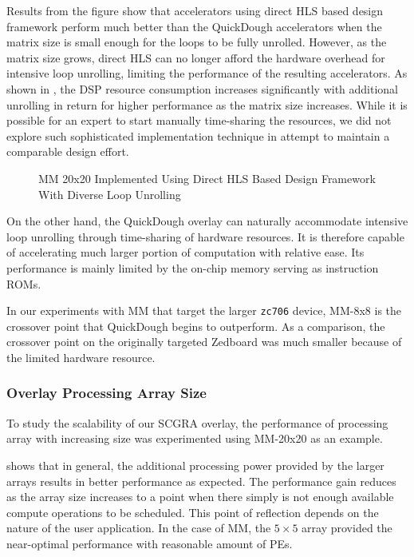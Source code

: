 Results from the figure show that accelerators using direct HLS based design framework perform much
better than the QuickDough accelerators when the matrix size is small enough for the loops to be
fully unrolled. However, as the matrix size grows, direct HLS can no longer afford the hardware overhead for
intensive loop unrolling, limiting the performance of the resulting accelerators. As shown in
, the DSP resource consumption increases significantly with
additional unrolling in return for higher performance as the matrix size increases.  While it is
possible for an expert to start manually time-sharing the resources, we did not explore such
sophisticated implementation technique in attempt to maintain a comparable design effort.

\begin{figure}
\caption{MM 20x20 Implemented Using Direct HLS Based Design Framework With Diverse Loop Unrolling}
\label{fig:loop-unroll-and-pipeline}
\end{figure}

On the other hand, the QuickDough overlay can naturally accommodate intensive loop unrolling through
time-sharing of hardware resources. It is therefore capable of accelerating much larger portion of
computation with relative ease. Its performance is mainly limited by the on-chip memory serving as
instruction ROMs.

In our experiments with MM that target the larger \texttt{zc706} device, MM-8x8 is the crossover point that QuickDough begins to outperform.  As a comparison, the crossover point on the originally targeted Zedboard was much smaller because of the limited hardware resource.




\subsubsection{Overlay Processing Array Size}
To study the scalability of our SCGRA overlay, the performance of processing array with increasing size was experimented using MM-20x20 as an example.

 shows that in general, the additional processing power provided by the larger arrays results in better performance as expected.
The performance gain reduces as the array size increases to a point when there simply is not enough available compute operations to be scheduled.
This point of reflection depends on the nature of the user application.
In the case of MM, the $5 \times 5$ array provided the near-optimal performance with reasonable amount of PEs.

